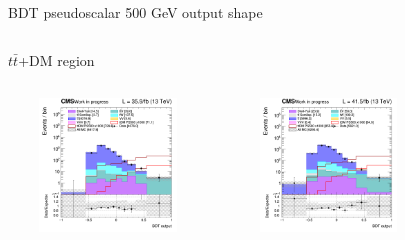 \documentclass[8pt]{beamer}
\begin{document}
\begin{frame}{BDT pseudoscalar 500 GeV output shape}
\vspace{-8pt}
\begin{columns}
\begin{column}{1.09\textwidth}
\begin{block}{\centering $t \bar t$+DM region}\end{block} \vspace{10pt}
\end{column}
\end{columns} \vspace{-16pt}
\begin{columns}
		\begin{column}{0.33\textwidth}
			\begin{center}
     			\includegraphics[width=1.0\textwidth, height=100pt]{figs/2016/SmearSR-ttDM-pseudo500/log_cratio_TTbar_topCR_ll_BDT_ttDM500_TTbar_BDT_output_pseudoscalar500_customBinsAttempt7.png}
    		\end{center}		
		\end{column}
		\begin{column}{0.33\textwidth}
			\begin{center}
     			\includegraphics[width=1.0\textwidth, height=100pt]{figs/2017/SmearSR-ttDM-pseudo500/log_cratio_TTbar_topCR_ll_BDT_ttDM500_TTbar_BDT_output_pseudoscalar500_customBinsAttempt7.png}
    		\end{center}		
		\end{column}
		\begin{column}{0.33\textwidth}
			\begin{center}

\end{center}
\end{column}
\end{columns}
\end{frame}
\end{document}
